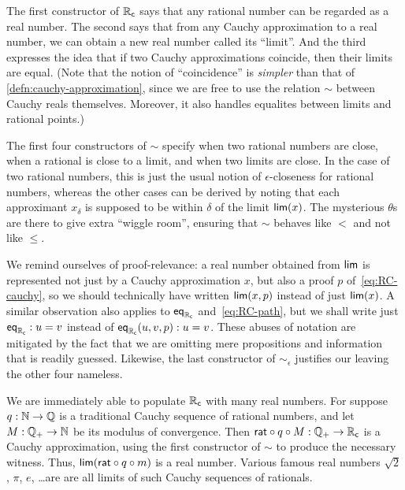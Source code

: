 The first constructor of $\mathbb{R}_\mathsf{c}$ says that any rational number can be regarded as a real number.
The second says that from any Cauchy approximation to a real number, we can obtain a new real number called its ``limit''.
And the third expresses the idea that if two Cauchy approximations coincide, then their limits are equal.
(Note that the notion of ``coincidence'' is \emph{simpler} than that of \autoref{defn:cauchy-approximation}, since we are free to use the relation $\sim$ between Cauchy reals themselves.
Moreover, it also handles equalites between limits and rational points.)

The first four constructors of $\sim$ specify when two rational numbers are close, when a rational is close to a limit, and when two limits are close.
In the case of two rational numbers, this is just the usual notion of $\epsilon$-closeness for rational numbers, whereas the other cases can be derived by noting that each approximant $x_\delta$ is supposed to be within $\delta$ of the limit $\mathsf{lim}(x)$.
The mysterious $\theta$s are there to give extra ``wiggle room'', ensuring that $\sim$ behaves like $<$ and not like $\leq$.

We remind ourselves of proof-relevance: a real number obtained from $\mathsf{lim}$ is represented not
just by a Cauchy approximation $x$, but also a proof $p$ of~\eqref{eq:RC-cauchy}, so we
should technically have written $\mathsf{lim}(x,p)$ instead of just $\mathsf{lim}(x)$.
A similar observation also applies to $\mathsf{eq}_{\mathbb{R}_\mathsf{c}}$ and~\eqref{eq:RC-path}, but we shall write just
$\mathsf{eq}_{\mathbb{R}_\mathsf{c}} : u = v$ instead of $\mathsf{eq}_{\mathbb{R}_\mathsf{c}}(u, v, p) : u = v$. These abuses of notation are
mitigated by the fact that we are omitting mere propositions and information that is
readily guessed.
Likewise, the last constructor of $\mathord{\sim_\epsilon}$ justifies our leaving the other four nameless.

We are immediately able to populate $\mathbb{R}_\mathsf{c}$ with many real numbers. For suppose $q : \mathbb{N} \to
\mathbb{Q}$ is a traditional Cauchy sequence of rational numbers, and let $M : \mathbb{Q}_{+} \to \mathbb{N}$ be its
modulus of convergence. Then $\mathsf{rat} \circ q \circ M : \mathbb{Q}_{+} \to \mathbb{R}_\mathsf{c}$ is a Cauchy
approximation, using the first constructor of $\sim$ to produce the necessary witness.
Thus, $\mathsf{lim}(\mathsf{rat} \circ q \circ m)$ is a real number. Various famous
real numbers $\sqrt{2}$, $\pi$, $e$, \dots are are all limits of such Cauchy sequences of
rationals.

\medskip

